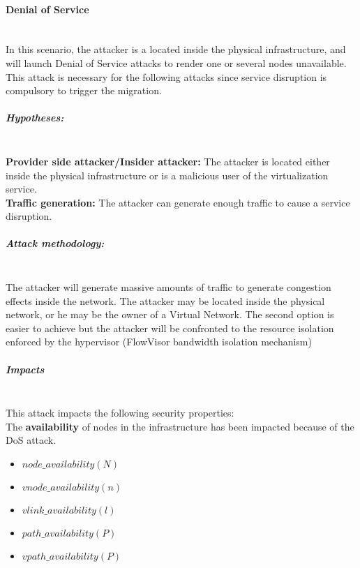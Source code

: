 



\paragraph{Denial of Service}\textbf{\\}
In this scenario, the attacker is a located inside the physical infrastructure, and will launch Denial of Service attacks to render one or several nodes unavailable.
This attack is necessary for the following attacks since service disruption is compulsory to trigger the migration.

\subparagraph{Hypotheses:}\textbf{\\}
\textbf{Provider side attacker/Insider attacker:} The attacker is located either inside the physical infrastructure or is a malicious user of the virtualization service.\\
\textbf{Traffic generation:} The attacker can generate enough traffic to cause a service disruption.

\subparagraph{Attack methodology:}\textbf{\\}
The attacker will generate massive amounts of traffic to generate congestion effects inside the network. The attacker may be located inside the physical network, or he may be the owner of a Virtual Network. The second option is easier to achieve but the attacker will be confronted to the resource isolation enforced by the hypervisor (\ie FlowVisor bandwidth isolation mechanism)


\subparagraph{Impacts}\textbf{\\}
This attack impacts the following security properties:\\
The \textbf{availability} of nodes in the infrastructure has been impacted because of the DoS attack.
\begin{itemize}
    \item $node\_availability(N)$
    \item $vnode\_availability(n)$
    \item $vlink\_availability(l)$
    \item $path\_availability(P)$
    \item $vpath\_availability(P)$
\end{itemize}

